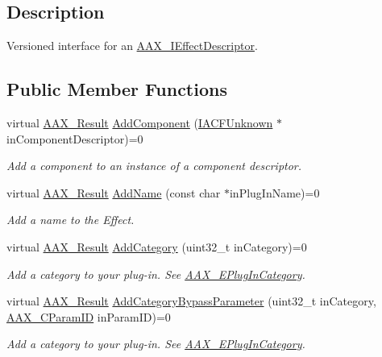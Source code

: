 \subsection{Description}
Versioned interface for an \mbox{\hyperlink{a01813}{A\+A\+X\+\_\+\+I\+Effect\+Descriptor}}. \subsection*{Public Member Functions}
\begin{DoxyCompactItemize}
\item 
virtual \mbox{\hyperlink{a00392_a4d8f69a697df7f70c3a8e9b8ee130d2f}{A\+A\+X\+\_\+\+Result}} \mbox{\hyperlink{a01653_a9e2eabbcaa46ada4b5f9bab2663f8a9f}{Add\+Component}} (\mbox{\hyperlink{a01409}{I\+A\+C\+F\+Unknown}} $\ast$in\+Component\+Descriptor)=0
\begin{DoxyCompactList}\small\item\em Add a component to an instance of a component descriptor. \end{DoxyCompactList}\item 
virtual \mbox{\hyperlink{a00392_a4d8f69a697df7f70c3a8e9b8ee130d2f}{A\+A\+X\+\_\+\+Result}} \mbox{\hyperlink{a01653_a931fdad618c2e12c1e921dca5b3c6f56}{Add\+Name}} (const char $\ast$in\+Plug\+In\+Name)=0
\begin{DoxyCompactList}\small\item\em Add a name to the Effect. \end{DoxyCompactList}\item 
virtual \mbox{\hyperlink{a00392_a4d8f69a697df7f70c3a8e9b8ee130d2f}{A\+A\+X\+\_\+\+Result}} \mbox{\hyperlink{a01653_a415d749d8a464a56543733c5270a018c}{Add\+Category}} (uint32\+\_\+t in\+Category)=0
\begin{DoxyCompactList}\small\item\em Add a category to your plug-\/in. See \mbox{\hyperlink{a00491_aef9637518fb1ac0e2f403444c73aba4a}{A\+A\+X\+\_\+\+E\+Plug\+In\+Category}}. \end{DoxyCompactList}\item 
virtual \mbox{\hyperlink{a00392_a4d8f69a697df7f70c3a8e9b8ee130d2f}{A\+A\+X\+\_\+\+Result}} \mbox{\hyperlink{a01653_af2f7f299d6012675960263812e7b31aa}{Add\+Category\+Bypass\+Parameter}} (uint32\+\_\+t in\+Category, \mbox{\hyperlink{a00392_a1440c756fe5cb158b78193b2fc1780d1}{A\+A\+X\+\_\+\+C\+Param\+ID}} in\+Param\+ID)=0
\begin{DoxyCompactList}\small\item\em Add a category to your plug-\/in. See \mbox{\hyperlink{a00491_aef9637518fb1ac0e2f403444c73aba4a}{A\+A\+X\+\_\+\+E\+Plug\+In\+Category}}. \end{DoxyCompactList}\item 

\end{DoxyCompactItemize}
